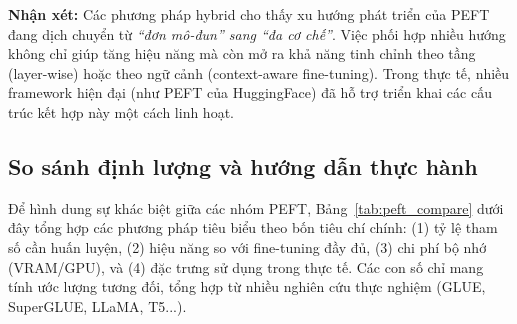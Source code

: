 \textbf{Nhận xét:}  
Các phương pháp hybrid cho thấy xu hướng phát triển của PEFT đang dịch chuyển từ \emph{“đơn mô-đun” sang “đa cơ chế”}.  
Việc phối hợp nhiều hướng không chỉ giúp tăng hiệu năng mà còn mở ra khả năng tinh chỉnh theo tầng (layer-wise) hoặc theo ngữ cảnh (context-aware fine-tuning).  
Trong thực tế, nhiều framework hiện đại (như PEFT của HuggingFace) đã hỗ trợ triển khai các cấu trúc kết hợp này một cách linh hoạt.

\subsection{So sánh định lượng và hướng dẫn thực hành}
\label{ssec:comparison}

Để hình dung sự khác biệt giữa các nhóm PEFT, Bảng~\ref{tab:peft_compare} dưới đây tổng hợp các phương pháp tiêu biểu theo bốn tiêu chí chính:  
(1) tỷ lệ tham số cần huấn luyện,  
(2) hiệu năng so với fine-tuning đầy đủ,  
(3) chi phí bộ nhớ (VRAM/GPU), và  
(4) đặc trưng sử dụng trong thực tế.  
Các con số chỉ mang tính ước lượng tương đối, tổng hợp từ nhiều nghiên cứu thực nghiệm (GLUE, SuperGLUE, LLaMA, T5...)\cite{houlsby2019parameter, hu2021lora, dettmers2023qlora, lester2021power, zaken2021bitfit}.

